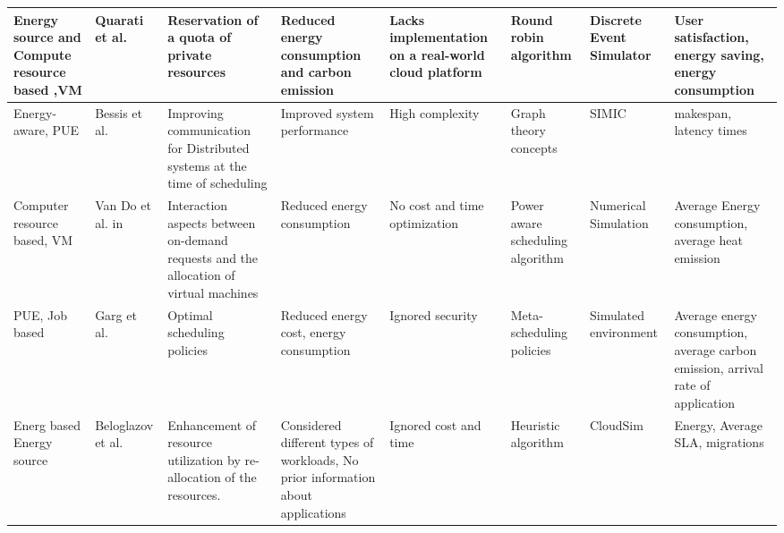\begin{sidewaystable*}[!htbp]
{\begin{tabular}{|g{2cm} p{1.5cm} p{2cm} p{2cm} p{2cm} p{2cm} p{2cm} p{2cm}|}
Energy source and  Compute resource based ,VM  & Quarati et al.~\cite{quarati2013hybrid} &  Reservation of a quota of private resources & Reduced energy consumption and carbon emission & Lacks implementation on a real-world cloud platform & Round robin algorithm & Discrete Event Simulator & User satisfaction, energy saving, energy consumption 
\\ \hline

Energy-aware, PUE & Bessis et al.~\cite{bessis2013using} & Improving communication for Distributed systems at the time of scheduling & Improved system performance & High complexity & Graph theory concepts & SIMIC & makespan, latency times 
\\ \hline 

Computer resource based, VM & Van Do et al. in~\cite{van2012comparison} & Interaction aspects between on-demand requests and the allocation of virtual machines & Reduced energy consumption & No cost and time optimization & Power aware scheduling algorithm & Numerical Simulation & Average Energy consumption, average heat emission 
\\ \hline

PUE, Job based & Garg et al.~\cite{garg2011environment} &  Optimal scheduling policies & Reduced energy cost, energy consumption & Ignored security & Meta-scheduling policies & Simulated environment  & Average energy consumption, average carbon emission, arrival rate of application 
 \\ \hline
 
Energ based Energy source & Beloglazov et al.~\cite{beloglazov2010energy} &  Enhancement of resource utilization by re-allocation of the resources. & Considered different types of workloads, No prior information about applications & Ignored cost and time & Heuristic algorithm & CloudSim & Energy, Average SLA, migrations
\\ \hline

\end{tabular}
}
\end{sidewaystable*}
